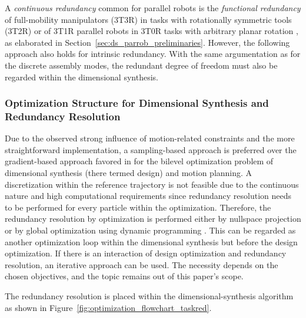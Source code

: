 A \emph{continuous redundancy} common for parallel robots is the \emph{functional redundancy} of full-mobility manipulators (3T3R) in tasks with rotationally symmetric tools (3T2R) \cite{SchapplerTapOrt2019c} or of 3T1R parallel robots in 3T0R tasks with arbitrary planar rotation \cite{Schappler2022_ARK3T1R}, {as elaborated in  Section~\ref{sec:ds_parrob_preliminaries}.}
However, the following approach also holds for intrinsic redundancy.
With the same argumentation as for the discrete assembly modes, the redundant degree of freedom must also be regarded within the dimensional synthesis.

\subsubsection{{Optimization Structure for Dimensional Synthesis and Redundancy Resolution}}
%
Due to the observed strong influence of motion-related constraints and the more straightforward implementation, a sampling-based approach is preferred over the gradient-based approach favored in \cite{Dinev2023} for the bilevel optimization problem of dimensional synthesis (there termed design) and motion planning.
A discretization within the reference trajectory is not feasible due to the continuous nature and high computational requirements since redundancy resolution needs to be performed for every particle within the optimization.
Therefore, the redundancy resolution by optimization is performed either by nullspace projection \cite{SchapplerOrt2021} or by global optimization using dynamic programming \cite{Schappler2023_ICINCOLNEE}.
This can be regarded as another optimization loop within the dimensional synthesis but before the design optimization.
If there is an interaction of design optimization and redundancy resolution, an iterative approach can be used.
The necessity depends on the chosen objectives, and the topic remains out of this paper's scope.

The redundancy resolution is placed within the dimensional-synthesis algorithm as shown in Figure~\ref{fig:optimization_flowchart_taskred}.

